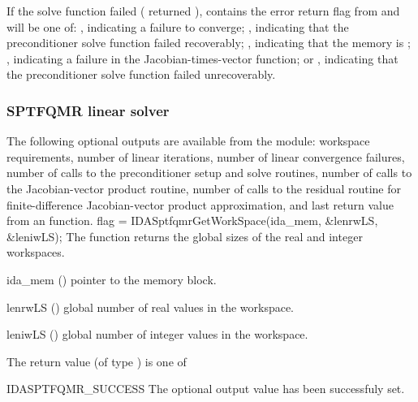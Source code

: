 {{  If the {\idaspbcg} solve function failed ( returned 
  ),  contains the error return flag from
   and will be one of:
  , indicating a failure to converge;
  , indicating that the preconditioner solve
  function  failed recoverably;
  , indicating that the {\spbcg} memory is ;
  , indicating a failure in the Jacobian-times-vector 
  function; or
  , indicating that the preconditioner solve
  function  failed unrecoverably.
}
%
%
\subsubsection{SPTFQMR linear solver}\label{sss:optout_sptfqmr}
The following optional outputs are available from the {\idasptfqmr} module:
workspace requirements, number of linear iterations,
number of linear convergence failures, number of calls to the preconditioner
setup and solve routines, number of calls to the Jacobian-vector product routine,
 number of calls to the residual routine for finite-difference  Jacobian-vector
 product approximation, and last return value from an {\idasptfqmr} function.
{
  flag = IDASptfqmrGetWorkSpace(ida\_mem, \&lenrwLS, \&leniwLS);
}
{
  The function  returns the global sizes of
  the {\idasptfqmr} real and integer workspaces.
}
{
  \begin{args}[lenrwLS]
  \item[ida\_mem] ()
    pointer to the {\ida} memory block.
  \item[lenrwLS] ()
    global number of real values in the {\idasptfqmr} workspace.
  \item[leniwLS] ()
    global number of integer values in the {\idasptfqmr} workspace.
  \end{args}
}
{
  The return value  (of type ) is one of
  \begin{args}
  \item[IDASPTFQMR\_SUCCESS] 
    The optional output value has been successfuly set.
  \item[\Id{IDASPTFQMR\_MEM\_NULL}]

\end{args}}}
